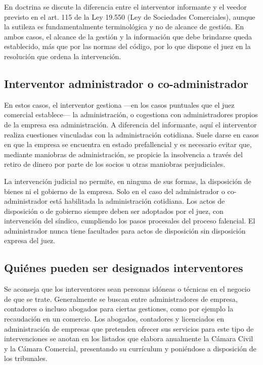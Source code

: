 \documentclass[12pt,oneside]{book}
\begin{document}
En doctrina se discute la diferencia entre el interventor informante y el veedor previsto en el art. 115 de la Ley 19.550 (Ley de Sociedades Comerciales), aunque la sutileza es fundamentalmente terminológica y no de alcance de gestión. En ambos casos, el alcance de la gestión y la información que debe brindarse queda establecido, más que por las normas del código, por lo que dispone el juez en la resolución que ordena la intervención.

\subsection{Interventor administrador o co-administrador}

En estos casos, el interventor gestiona ---en los casos puntuales que el juez comercial establece--- la administración, o cogestiona con administradores propios de la empresa esa administración. A diferencia del informante, aquí el interventor realiza cuestiones vinculadas con la administración cotidiana. Suele darse en casos en que la empresa se encuentra en estado prefallencial y es necesario evitar que, mediante maniobras de administración, se propicie la insolvencia a través del retiro de dinero por parte de los socios u otras maniobras perjudiciales.

\begin{important}
La intervención judicial no permite, en ninguna de sus formas, la disposición de bienes ni el gobierno de la empresa. Solo en el caso del administrador o co-administrador está habilitada la administración cotidiana. Los actos de disposición o de gobierno siempre deben ser adoptados por el juez, con intervención del síndico, cumpliendo los pasos procesales del proceso falencial. El administrador nunca tiene facultades para actos de disposición sin disposición expresa del juez.
\end{important}

\subsection{Quiénes pueden ser designados interventores}

Se aconseja que los interventores sean personas idóneas o técnicas en el negocio de que se trate. Generalmente se buscan entre administradores de empresa, contadores o incluso abogados para ciertas gestiones, como por ejemplo la recaudación en un comercio. Los abogados, contadores y licenciados en administración de empresas que pretenden ofrecer sus servicios para este tipo de intervenciones se anotan en los listados que elabora anualmente la Cámara Civil y la Cámara Comercial, presentando su currículum y poniéndose a disposición de los tribunales.
\end{document}
